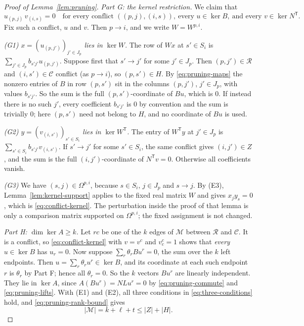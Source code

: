 \documentclass[11pt]{article}
\theoremstyle{remark}
\newcommand{\abs}[1]{\lvert #1\rvert}
\begin{document}
\begin{proof}[Proof of Lemma~\ref{lem:pruning}]
\medskip\noindent
\emph{Part G: the kernel restriction.}
We claim that
\begin{equation}\label{eq:conflict-kernel}
 u_{(p,j)}\,v_{(i,s)}=0
 \quad\text{for every conflict }((p,j),(i,s)),\ \text{every }
 u\in\ker B,\ \text{and every }v\in\ker N^{\mathsf T}.
\end{equation}
Fix such a conflict, $u$ and $v$.  Then $p\to i$, and we write $W=W^{p,i}$.

\emph{(G1) $x=(u_{(p,j')})_{j'\in J_p}$ lies in $\ker W$.}
The row of $Wx$ at $s'\in S_i$ is $\sum_{j'\in J_p}b_{s'j'}u_{(p,j')}$.
Suppose first that $s'\to j'$ for some $j'\in J_p$.  Then
$(p,j')\in\mathcal R$ and $(i,s')\in\mathcal C$ conflict (as $p\to i$), so
$(p,s')\in H$.  By \eqref{eq:pruning-maps} the nonzero entries of $B$ in
row $(p,s')$ sit in the columns $(p,j')$, $j'\in J_p$, with values
$b_{s'j'}$.  So the sum is the full $(p,s')$-coordinate of $Bu$, which is
$0$.  If instead there is no such $j'$, every coefficient $b_{s'j'}$ is $0$
by convention and the sum is trivially $0$; here $(p,s')$ need not belong
to $H$, and no coordinate of $Bu$ is used.

\emph{(G2) $y=(v_{(i,s')})_{s'\in S_i}$ lies in $\ker W^{\mathsf T}$.}
The entry of $W^{\mathsf T}y$ at $j'\in J_p$ is
$\sum_{s'\in S_i}b_{s'j'}v_{(i,s')}$.  If $s'\to j'$ for some $s'\in S_i$,
the same conflict gives $(i,j')\in Z$, and the sum is the full
$(i,j')$-coordinate of $N^{\mathsf T}v=0$.  Otherwise all coefficients
vanish.

\emph{(G3)} We have $(s,j)\in\Omega^{p,i}$, because $s\in S_i$, $j\in J_p$
and $s\to j$.  By (E3), Lemma~\ref{lem:kernel-support} applies to the fixed
real matrix $W$ and gives $x_jy_s=0$, which is \eqref{eq:conflict-kernel}.
The perturbation inside the proof of that lemma is only a comparison matrix
supported on $\Omega^{p,i}$; the fixed assignment is not changed.

\medskip\noindent
\emph{Part H: $\dim\ker A\ge k$.}
Let $rc$ be one of the $k$ edges of $\mathcal M$ between $\mathcal R$ and
$\mathcal C$.  It is a conflict, so \eqref{eq:conflict-kernel} with $v=v^c$
and $v^c_c=1$ shows that \emph{every} $u\in\ker B$ has $u_r=0$.  Now suppose
$\sum_r\theta_rBu^r=0$, the sum over the $k$ left endpoints.  Then
$u=\sum_r\theta_ru^r\in\ker B$, and its coordinate at each such endpoint
$r$ is $\theta_r$ by Part F; hence all $\theta_r=0$.  So the $k$ vectors
$Bu^r$ are linearly independent.  They lie in $\ker A$, since
$A(Bu^r)=NLu^r=0$ by \eqref{eq:pruning-commute} and
\eqref{eq:pruning-lifts}.  With (E1) and (E2), all three conditions in
\eqref{eq:three-conditions} hold, and \eqref{eq:pruning-rank-bound} gives
\[
 \abs{\mathcal M}=k+\ell+t\le\abs Z+\abs H .
\]


\end{proof}
\end{document}
